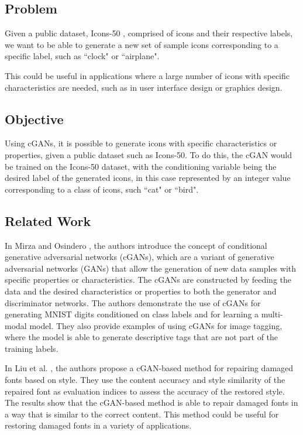 \documentclass[conference]{IEEEtran}
\begin{document}
\subsection{Problem}

Given a public dataset, Icons-50 \cite{Icons50, Hendrycks2018}, comprised of icons and their respective labels, we want to be able to generate a new set of sample icons corresponding to a specific label, such as ``clock" or ``airplane".

This could be useful in applications where a large number of icons with specific characteristics are needed, such as in user interface design or graphics design.

\subsection{Objective}

Using cGANs, it is possible to generate icons with specific characteristics or properties, given a public dataset such as Icons-50. To do this, the cGAN would be trained on the Icons-50 dataset, with the conditioning variable being the desired label of the generated icons, in this case represented by an integer value corresponding to a class of icons, such ``cat" or ``bird".

\subsection{Related Work}

In Mirza and Osindero \cite{Mirza2014}, the authors introduce the concept of conditional generative adversarial networks (cGANs), which are a variant of generative adversarial networks (GANs) that allow the generation of new data samples with specific properties or characteristics. The cGANs are constructed by feeding the data and the desired characteristics or properties to both the generator and discriminator networks. The authors demonstrate the use of cGANs for generating MNIST digits conditioned on class labels and for learning a multi-modal model. They also provide examples of using cGANs for image tagging, where the model is able to generate descriptive tags that are not part of the training labels.

In Liu et al. \cite{Liu2021SCCGAN:CGAN}, the authors propose a cGAN-based method for repairing damaged fonts based on style. They use the content accuracy and style similarity of the repaired font as evaluation indices to assess the accuracy of the restored style. The results show that the cGAN-based method is able to repair damaged fonts in a way that is similar to the correct content. This method could be useful for restoring damaged fonts in a variety of applications.
\end{document}
